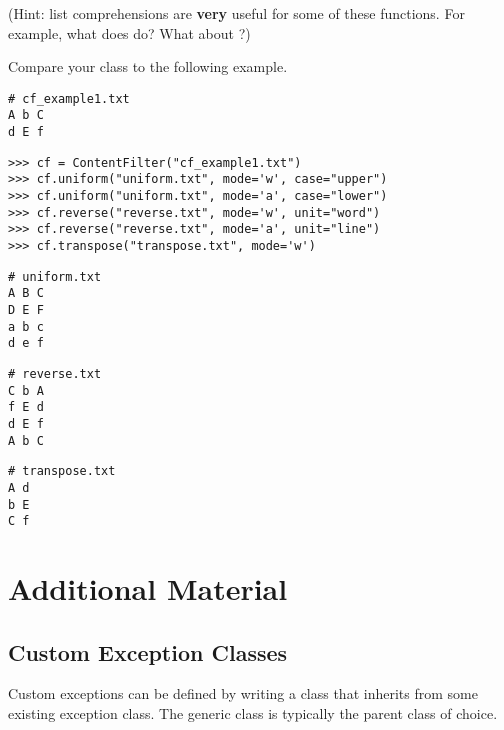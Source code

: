 \begin{problem}
\begin{enumerate}
\end{enumerate}

(Hint: list comprehensions are \textbf{very} useful for some of these functions.
For example, what does  do?
What about ?)

Compare your class to the following example.

\begin{lstlisting}
# cf_example1.txt
A b C
d E f
\end{lstlisting}

\begin{lstlisting}
>>> cf = ContentFilter("cf_example1.txt")
>>> cf.uniform("uniform.txt", mode='w', case="upper")
>>> cf.uniform("uniform.txt", mode='a', case="lower")
>>> cf.reverse("reverse.txt", mode='w', unit="word")
>>> cf.reverse("reverse.txt", mode='a', unit="line")
>>> cf.transpose("transpose.txt", mode='w')
\end{lstlisting}

\begin{lstlisting}
# uniform.txt
A B C
D E F
a b c
d e f
\end{lstlisting}

\begin{lstlisting}
# reverse.txt
C b A
f E d
d E f
A b C
\end{lstlisting}

\begin{lstlisting}
# transpose.txt
A d
b E
C f
\end{lstlisting}
\end{problem}

\newpage

\section*{Additional Material} %

\subsection*{Custom Exception Classes} %

Custom exceptions can be defined by writing a class that inherits from some existing exception class.
The generic  class is typically the parent class of choice.

